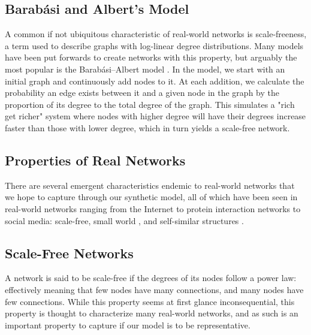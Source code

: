 \documentclass[12pt,twoside]{report}
\begin{document}
\subsection{Barabási and Albert's Model}

A common if not ubiquitous characteristic of real-world networks is scale-freeness, a term used to describe graphs with log-linear degree distributions. Many models have been put forwards to create networks with this property, but arguably the most popular is the Barabási–Albert model \cite{barabasi1999emergence}. In the model, we start with an initial graph and continuously add nodes to it. At each addition, we calculate the probability an edge exists between it and a given node in the graph by the proportion of its degree to the total degree of the graph. This simulates a "rich get richer" system where nodes with higher degree will have their degrees increase faster than those with lower degree, which in turn yields a scale-free network. \\

\subsection{Properties of Real Networks}

There are several emergent characteristics endemic to real-world networks that we hope to capture through our synthetic model, all of which have been seen in real-world networks ranging from the Internet to protein interaction networks to social media: scale-free, small world \cite{wang2003complex}, and self-similar structures \cite{song2005self}. \\

\subsection{Scale-Free Networks}
A network is said to be scale-free if the degrees of its nodes follow a power law: effectively meaning that few nodes have many connections, and many nodes have few connections. While this property seems at first glance inconsequential, this property is thought to characterize many real-world networks, and as such is an important property to capture if our model is to be representative.  \\
\end{document}
